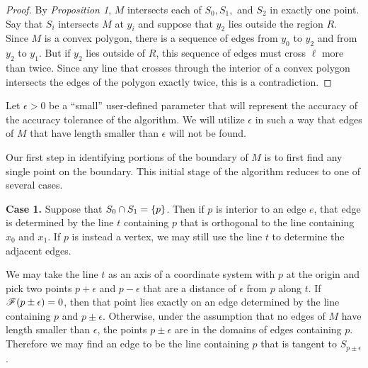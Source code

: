 \documentclass[12pt]{article}
\begin{document}
\begin{flushleft}
\begin{proof}
	By \textit{Proposition 1}, $M$ intersects each of $S_0, S_1,$ and $S_2$ in exactly one point. 	
	Say that $S_i$ intersects $M$ at $y_i$ and suppose that $y_2$ lies outside the region $R$. 
	Since $M$ is a convex polygon, there is a sequence of edges from $y_0$ to $y_2$ and from $y_2$ to $y_1$.
	But if $y_2$ lies outside of $R$, this sequence of edges must cross $\ell$ more than twice.
	Since any line that crosses through the interior of a convex polygon intersects the edges of the polygon exactly twice, this is a contradiction.
\end{proof}


Let $\epsilon>0$ be a ``small'' user-defined parameter that will represent the accuracy of the accuracy tolerance of the algorithm.
We will utilize $\epsilon$ in such a way that edges of $M$ that have length smaller than $\epsilon$ will not be found.

Our first step in identifying portions of the boundary of $M$ is to first find any single point on the boundary. 
This initial stage of the algorithm reduces to one of several cases.

\textbf{Case 1.} 
Suppose that $S_0\cap S_1=\{p\}$.
Then if $p$ is interior to an edge $e$, that edge is determined by the line $t$ containing $p$ that is orthogonal to the line containing $x_0$ and $x_1$.
If $p$ is instead a vertex, we may still use the line $t$ to determine the adjacent edges.

We may take the line $t$ as an axis of a coordinate system with $p$ at the origin and pick two points $p+\epsilon$ and $p-\epsilon$ that are a distance of $\epsilon$ from $p$ along $t$.
If $\mathscr{F}(p\pm\epsilon)=0$, then that point lies exactly on an edge determined by the line containing $p$ and $p\pm\epsilon$.
Otherwise, under the assumption that no edges of $M$ have length smaller than $\epsilon$, the points $p\pm\epsilon$ are in the domains of edges containing $p$.
Therefore we may find an edge to be the line containing $p$ that is tangent to $S_{p\pm\epsilon}$.


\end{flushleft}
\end{document}
